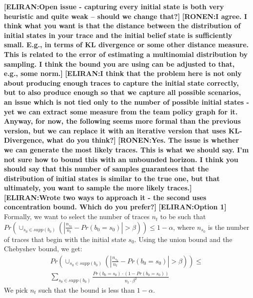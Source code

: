 \documentclass[letterpaper]{article} %
\theoremstyle{definition}
\newcommand{\eliran}[1]{\textbf{[\color{red}ELIRAN:#1]}}
\newcommand{\ronen}[1]{\textbf{[\color{blue}RONEN:#1]}}
\begin{document}
\eliran{Open issue - capturing every initial state is both very heuristic and quite weak -- should we change that?}
\ronen{I agree. I think what you want is that the distance between the
distribution of initial states in your trace and the initial belief state is
sufficiently small. E.g., in terms of KL divergence or some other distance measure. This is related to the error of estimating a multinomial distribution by sampling. I think the bound you are using can be adjusted to that,
e.g., some norm.}
\eliran{I think that the problem here is not only about producing enough traces to capture the initial state correctly, but to also produce enough so that we capture all possible scenarios, an issue which is not tied only to the number of possible initial states - yet we can extract some measure from the team policy graph for it. Anyway, for now, the following seems more formal than the previous version, but we can replace it with an iterative version that uses KL-Divergence, what do you think?}
\ronen{Yes. The issue is whether we can generate the most likely traces. This is what we should say. I'm not sure how to bound this with an unbounded horizon. I think you should say that this number of samples guarantees that the distribution of initial states is similar to the true one, but that ultimately, you want to sample the more likely traces.}
\eliran{Wrote two ways to approach it - the second uses concentration bound. Which do you prefer?}
\eliran{Option 1}
Formally, we want to select the number of traces $n_t$ to be such that $Pr(\cup_{s_0\in supp(b_0)}(|\frac{n_{s_0}}{n_t}-Pr(b_0=s_0)|>\beta)) \leq 1-\alpha$, where $n_{s_0}$ is the number of traces that begin with the initial state $s_0$.
Using the union bound and the Chebyshev bound, we get:
\begin{align*}
    Pr(\cup_{s_0\in supp(b_0)}(|\frac{n_{s_0}}{n_t}-Pr(b_0=s_0)|>\beta)) \leq \\
    \sum_{s_0\in supp(b_0)}\frac{Pr(b_0=s_0) \cdot (1-Pr(b_0=s_0))}{n_t \cdot \beta^2}
\end{align*}
We pick $n_t$ such that the bound is less than $1-\alpha$.
\end{document}
